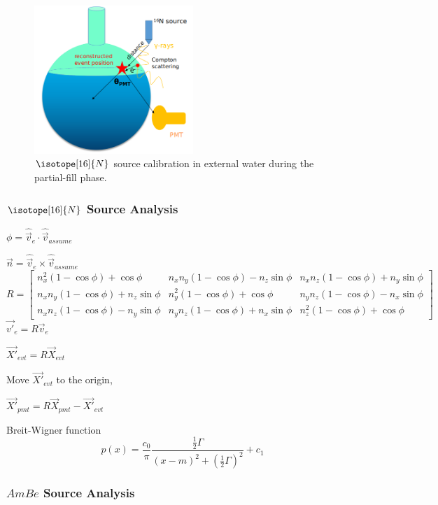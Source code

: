 \begin{figure}[!htb]
	\centering
	\includegraphics[width=6cm]{partialN16.png}
	\caption{$\isotope[16]{N}$ source calibration in external water during the partial-fill phase.}
	\label{partialN16}
\end{figure}


\subsubsection{$\isotope[16]{N}$ Source Analysis}

$\phi=\hat{\vec{v}}_e\cdot\hat{\vec{v}}_{assume}$

$\vec{n}=\hat{\vec{v}}_e\times\hat{\vec{v}}_{assume}$
\[
R=\begin{bmatrix}
n^2_x(1-\cos\phi)+\cos\phi       &n_xn_y(1-\cos\phi)-n_z\sin\phi & n_xn_z(1-\cos\phi)+n_y\sin\phi \\
n_xn_y(1-\cos\phi)+n_z\sin\phi & n^2_y(1-\cos\phi)+\cos\phi & n_yn_z(1-\cos\phi)-n_x\sin\phi \\
n_xn_z(1-\cos\phi)-n_y\sin\phi & n_yn_z(1-\cos\phi)+n_x\sin\phi & n^2_z(1-\cos\phi)+\cos\phi
\end{bmatrix}
\]
$\vec{v'}_e=R\vec{v}_e$

$\vec{X'}_{evt}=R\vec{X}_{evt}$

Move $\vec{X'}_{evt}$ to the origin,

$\vec{X'}_{pmt}=R\vec{X}_{pmt}-\vec{X'}_{evt}$

Breit-Wigner function
\[
p(x) = \frac{c_0}{\pi}\frac{\frac{1}{2} \Gamma}{(x-m)^2 + (\frac{1}{2} \Gamma)^2}+c_1
\]

\subsubsection{$AmBe$ Source Analysis}









